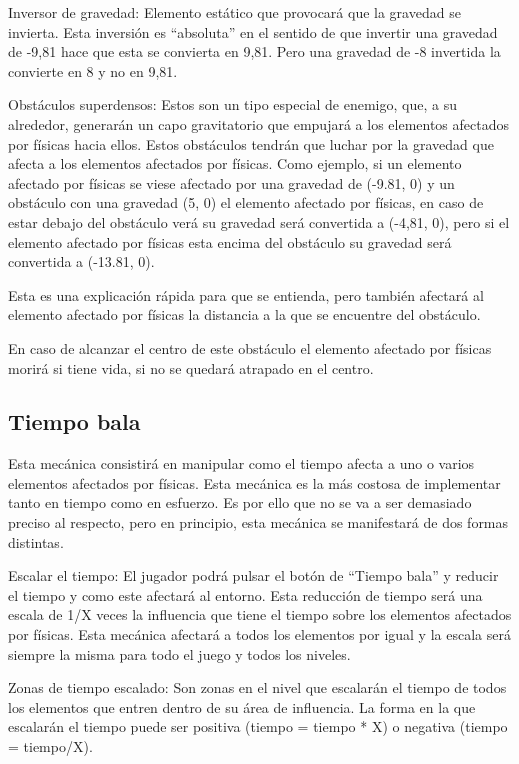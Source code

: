 Inversor de gravedad: Elemento estático que provocará que la gravedad se invierta. Esta inversión es “absoluta” en el sentido de que invertir una gravedad de -9,81 hace que esta se convierta en 9,81. Pero una gravedad de -8 invertida la convierte en 8 y no en 9,81.

Obstáculos superdensos: Estos son un tipo especial de enemigo, que, a su alrededor, generarán un capo gravitatorio que empujará a los elementos afectados por físicas hacia ellos. Estos obstáculos tendrán que luchar por la gravedad que afecta a los elementos afectados por físicas. Como ejemplo, si un elemento afectado por físicas se viese afectado por una gravedad de (-9.81, 0) y un obstáculo con una gravedad (5, 0) el elemento afectado por físicas, en caso de estar debajo del obstáculo verá su gravedad será convertida a (-4,81, 0), pero si el elemento afectado por físicas esta encima del obstáculo su gravedad será convertida a (-13.81, 0).

Esta es una explicación rápida para que se entienda, pero también afectará al elemento afectado por físicas la distancia a la que se encuentre del obstáculo.

En caso de alcanzar el centro de este obstáculo el elemento afectado por físicas morirá si tiene vida, si no se quedará atrapado en el centro.

\subsection{Tiempo bala}
Esta mecánica consistirá en manipular como el tiempo afecta a uno o varios elementos afectados por físicas. Esta mecánica es la más costosa de implementar tanto en tiempo como en esfuerzo. Es por ello que no se va a ser demasiado preciso al respecto, pero en principio, esta mecánica se manifestará de dos formas distintas.

Escalar el tiempo: El jugador podrá pulsar el botón de “Tiempo bala” y reducir el tiempo y como este afectará al entorno. Esta reducción de tiempo será una escala de 1/X veces la influencia que tiene el tiempo sobre los elementos afectados por físicas. Esta mecánica afectará a todos los elementos por igual y la escala será siempre la misma para todo el juego y todos los niveles.

Zonas de tiempo escalado: Son zonas en el nivel que escalarán el tiempo de todos los elementos que entren dentro de su área de influencia. La forma en la que escalarán el tiempo puede ser positiva (tiempo = tiempo * X) o negativa (tiempo = tiempo/X).

